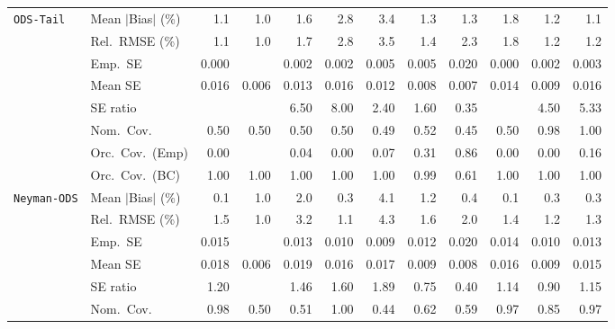 \begin{landscape}
\begin{longtable}{llrrrrrrrrrr}
\addlinespace[2pt]
\quad \texttt{ODS-Tail} & Mean $|$Bias$|$ (\%) & \cellcolor{ranktwo}1.1 & \cellcolor{rankone}1.0 & 1.6 & 2.8 & 3.4 & 1.3 & 1.3 & 1.8 & \cellcolor{rankthree}1.2 & \cellcolor{ranktwo}1.1 \\
 & Rel.\ RMSE (\%) & \cellcolor{ranktwo}1.1 & \cellcolor{rankone}1.0 & 1.7 & 2.8 & 3.5 & 1.4 & 2.3 & 1.8 & \cellcolor{rankthree}1.2 & \cellcolor{rankthree}1.2 \\
 & Emp.\ SE & 0.000 &  & 0.002 & 0.002 & 0.005 & 0.005 & 0.020 & 0.000 & 0.002 & 0.003 \\
 & Mean SE & 0.016 & 0.006 & 0.013 & 0.016 & 0.012 & 0.008 & 0.007 & 0.014 & 0.009 & 0.016 \\
 & SE ratio &  &  & 6.50 & 8.00 & \cellcolor{rankthree}2.40 & \cellcolor{rankone}1.60 & \cellcolor{ranktwo}0.35 &  & 4.50 & 5.33 \\
 & Nom.\ Cov. & 0.50 & 0.50 & 0.50 & 0.50 & 0.49 & \cellcolor{rankthree}0.52 & 0.45 & 0.50 & \cellcolor{rankone}0.98 & \cellcolor{ranktwo}1.00 \\
 & Orc.\ Cov.\ (Emp) & 0.00 &  & 0.04 & 0.00 & 0.07 & \cellcolor{ranktwo}0.31 & \cellcolor{rankone}0.86 & 0.00 & 0.00 & \cellcolor{rankthree}0.16 \\
 & Orc.\ Cov.\ (BC) & \cellcolor{ranktwo}1.00 & \cellcolor{ranktwo}1.00 & \cellcolor{ranktwo}1.00 & \cellcolor{ranktwo}1.00 & \cellcolor{ranktwo}1.00 & \cellcolor{rankone}0.99 & \cellcolor{rankthree}0.61 & \cellcolor{ranktwo}1.00 & \cellcolor{ranktwo}1.00 & \cellcolor{ranktwo}1.00 \\
\addlinespace[2pt]
\quad \texttt{Neyman-ODS} & Mean $|$Bias$|$ (\%) & \cellcolor{rankone}0.1 & 1.0 & 2.0 & \cellcolor{ranktwo}0.3 & 4.1 & 1.2 & \cellcolor{rankthree}0.4 & \cellcolor{rankone}0.1 & \cellcolor{ranktwo}0.3 & \cellcolor{ranktwo}0.3 \\
 & Rel.\ RMSE (\%) & 1.5 & \cellcolor{rankone}1.0 & 3.2 & \cellcolor{ranktwo}1.1 & 4.3 & 1.6 & 2.0 & 1.4 & \cellcolor{rankthree}1.2 & 1.3 \\
 & Emp.\ SE & 0.015 &  & 0.013 & 0.010 & 0.009 & 0.012 & 0.020 & 0.014 & 0.010 & 0.013 \\
 & Mean SE & 0.018 & 0.006 & 0.019 & 0.016 & 0.017 & 0.009 & 0.008 & 0.016 & 0.009 & 0.015 \\
 & SE ratio & 1.20 &  & 1.46 & 1.60 & 1.89 & 0.75 & 0.40 & \cellcolor{ranktwo}1.14 & \cellcolor{rankone}0.90 & \cellcolor{rankthree}1.15 \\
 & Nom.\ Cov. & \cellcolor{ranktwo}0.98 & 0.50 & 0.51 & \cellcolor{rankthree}1.00 & 0.44 & 0.62 & 0.59 & \cellcolor{rankone}0.97 & 0.85 & \cellcolor{rankone}0.97 \\

\end{longtable}
\end{landscape}
